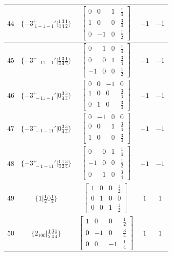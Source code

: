 \documentclass[fleqn,8pt]{jsarticle}
\begin{document}
\begin{longtable}{ccccc}
$ 44 $ & $ \{-3^{+}_{\,\,1-1-1}{}'|\frac{1}{4} \frac{3}{4} \frac{1}{2}\} $ & $ \begin{bmatrix} 0 & 0 & 1 & \frac{1}{4} \\ 1 & 0 & 0 & \frac{3}{4} \\ 0 & -1 & 0 & \frac{1}{2} \end{bmatrix} $ & $ -1 $ & $ -1 $ \\ \hline
$ 45 $ & $ \{-3^{-}_{\,\,-11-1}{}'|\frac{1}{4} \frac{3}{4} \frac{1}{2}\} $ & $ \begin{bmatrix} 0 & 1 & 0 & \frac{1}{4} \\ 0 & 0 & 1 & \frac{3}{4} \\ -1 & 0 & 0 & \frac{1}{2} \end{bmatrix} $ & $ -1 $ & $ -1 $ \\ \hline
$ 46 $ & $ \{-3^{+}_{\,\,-11-1}{}'|0 \frac{3}{4} \frac{3}{4}\} $ & $ \begin{bmatrix} 0 & 0 & -1 & 0 \\ 1 & 0 & 0 & \frac{3}{4} \\ 0 & 1 & 0 & \frac{3}{4} \end{bmatrix} $ & $ -1 $ & $ -1 $ \\ \hline
$ 47 $ & $ \{-3^{-}_{\,\,-1-11}{}'|0 \frac{3}{4} \frac{3}{4}\} $ & $ \begin{bmatrix} 0 & -1 & 0 & 0 \\ 0 & 0 & 1 & \frac{3}{4} \\ 1 & 0 & 0 & \frac{3}{4} \end{bmatrix} $ & $ -1 $ & $ -1 $ \\ \hline
$ 48 $ & $ \{-3^{+}_{\,\,-1-11}{}'|\frac{1}{4} \frac{1}{2} \frac{3}{4}\} $ & $ \begin{bmatrix} 0 & 0 & 1 & \frac{1}{4} \\ -1 & 0 & 0 & \frac{1}{2} \\ 0 & 1 & 0 & \frac{3}{4} \end{bmatrix} $ & $ -1 $ & $ -1 $ \\ \hline
$ 49 $ & $ \{1|\frac{1}{2} 0 \frac{1}{2}\} $ & $ \begin{bmatrix} 1 & 0 & 0 & \frac{1}{2} \\ 0 & 1 & 0 & 0 \\ 0 & 0 & 1 & \frac{1}{2} \end{bmatrix} $ & $ 1 $ & $ 1 $ \\ \hline
$ 50 $ & $ \{2{}_{100}|\frac{1}{2} \frac{3}{4} \frac{1}{4}\} $ & $ \begin{bmatrix} 1 & 0 & 0 & \frac{1}{2} \\ 0 & -1 & 0 & \frac{3}{4} \\ 0 & 0 & -1 & \frac{1}{4} \end{bmatrix} $ & $ 1 $ & $ 1 $ \\ \hline

\end{longtable}
\end{document}
